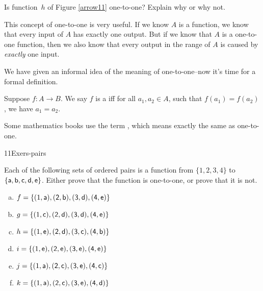 \begin{exercise}{}
Is function~$h$ of Figure \ref{arrow11} one-to-one?  Explain why or why not.
\end{exercise}

This concept of one-to-one is very useful.  If we know $A$ is a function, we know that every input of $A$ has exactly one output.  But if we know that $A$ is a one-to-one function, then we also know that every output in the range of $A$ is caused by \emph{exactly} one input.  

We have given an informal idea of the meaning of one-to-one--now it's time for a formal definition.

\begin{defn} \label{121defn}
Suppose $f \colon A \to B$. We say $f$ is a  iff for all $a_1,a_2 \in A$, such that
$f(a_1) = f(a_2)$, we have $a_1 = a_2$. 
\end{defn}
Some mathematics books use the term , which means exactly the same as one-to-one.

\begin{exercise}{11Exers-pairs}
 
 Each of the following sets of ordered pairs is a function from $\{1,2,3,4\}$ to $\{\sf{a},\sf{b},\sf{c},\sf{d},\sf{e}\}$. Either prove that the function is one-to-one, or prove that it is not.
\begin{multicols}{2}
\begin{enumerate}[(a)]
\item  \label{11Exers-pairs-f}
$f = \{ (1,\sf{a}), (2,\sf{b}), (3,\sf{d}), (4,\sf{e})\}$
\item  \label{11Exers-pairs-g}
$g = \{ (1,\sf{c}), (2,\sf{d}), (3,\sf{d}), (4,\sf{e})\}$
\item  \label{11Exers-pairs-h}
$h = \{ (1,\sf{e}), (2,\sf{d}), (3,\sf{c}), (4,\sf{b})\}$
\item  \label{11Exers-pairs-i}
$i = \{ (1,\sf{e}), (2,\sf{e}), (3,\sf{e}), (4,\sf{e})\}$
\item  \label{11Exers-pairs-j}
$j = \{ (1,\sf{a}), (2,\sf{c}), (3,\sf{e}), (4,\sf{c})\}$
\item  \label{11Exers-pairs-k}
$k = \{ (1,\sf{a}), (2,\sf{c}), (3,\sf{e}), (4,\sf{d})\}$
\end{enumerate}
\end{multicols}
\end{exercise}

